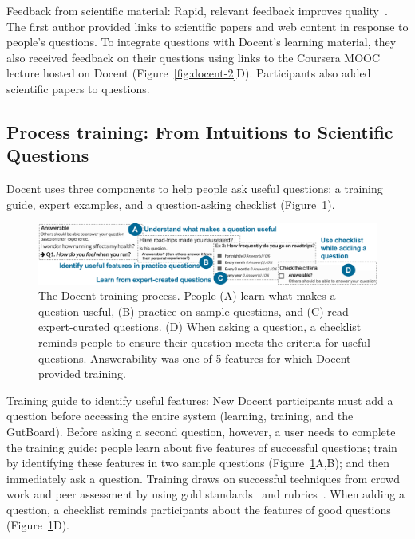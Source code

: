 Feedback from scientific material: Rapid, relevant feedback improves quality~\cite{Hattie2007}. The first author provided links to scientific papers and web content in response to people’s questions. To integrate questions with Docent’s learning material, they also received feedback on their questions using links to the Coursera MOOC lecture hosted on Docent (Figure~\ref{fig:docent-2}D). Participants also added scientific papers to questions. 

\subsection{Process training: From Intuitions to Scientific Questions}
Docent uses three components to help people ask useful questions: a training guide, expert examples, and a question-asking checklist (Figure~\ref{fig:docent-3}). 

\begin{figure}[b] 
  \centering
  \includegraphics[width=1.0\textwidth]{figures/docent/fig-3.png}
  \caption[The Docent training process]
{The Docent training process. People (A) learn what makes a question useful, (B) practice on sample questions, and (C) read expert-curated questions. (D) When asking a question, a checklist reminds people to ensure their question meets the criteria for useful questions. Answerability was one of 5 features for which Docent provided training.}
  \label{fig:docent-3}
\end{figure}

Training guide to identify useful features: New Docent participants must add a question before accessing the entire system (learning, training, and the GutBoard). Before asking a second question, however, a user needs to complete the training guide: people learn about five features of successful questions; train by identifying these features in two sample questions (Figure~\ref{fig:docent-3}A,B); and then immediately ask a question. Training draws on successful techniques from crowd work and peer assessment by using gold standards~\cite{Kittur2013} and rubrics~\cite{Andrade2005}. When adding a question, a checklist reminds participants about the features of good questions (Figure~\ref{fig:docent-3}D).

